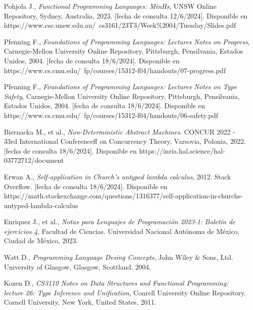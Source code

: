 \begin{thebibliography}{11}
    \bibitem{}
    \label{sec:116}
    \hypertarget{116}{}
    Pohjola J., \textit{Functional Programming Languages: MinHs}, UNSW Online Repository, Sydney, Australia, 2023.  [fecha de consulta 12/6/2024]. Disponible en https://www.cse.unsw.edu.au/~cs3161/23T3/Week\%2004/Tuesday/Slides.pdf

    \bibitem{}
    \label{sec:117}
    \hypertarget{117}{}
    Pfenning F., \textit{Foundations of Programming Languages: Lectures Notes on Progress}, Carnegie-Mellon University Online Repository, Pittsburgh, Pensilvania, Estados Unidos, 2004.  [fecha de consulta 18/6/2024]. Disponible en https://www.cs.cmu.edu/~fp/courses/15312-f04/handouts/07-progress.pdf

    \bibitem{}
    \label{sec:118}
    \hypertarget{118}{}
    Pfenning F., \textit{Foundations of Programming Languages: Lectures Notes on Type Safety}, Carnegie-Mellon University Online Repository, Pittsburgh, Pensilvania, Estados Unidos, 2004.  [fecha de consulta 18/6/2024]. Disponible en https://www.cs.cmu.edu/~fp/courses/15312-f04/handouts/06-safety.pdf

    \bibitem{}
    \label{sec:119}
    \hypertarget{119}{}
    Biernacka M., et al., \textit{Non-Deterministic Abstract Machines}. CONCUR 2022 - 33rd International Conferenceff on Concurrency Theory, Varsovia, Polonia, 2022.  [fecha de consulta 18/6/2024]. Disponible en  https://inria.hal.science/hal-03772712/document


    \bibitem{}
    \label{sec:120}
    \hypertarget{120}{}
    Erwan A., \textit{Self-application in Church's untyped lambda calculus}, 2012. Stack Overflow. [fecha de consulta 18/6/2024]. Disponible en https://math.stackexchange.com/questions/1316377/self-application-in-churchs-untyped-lambda-calculus

    \bibitem{}
    \label{sec:121}
    \hypertarget{121}{}
    Enriquez J., et al., \textit{Notas  para Lenguajes de Programación 2023-1: Boletín de ejercicios 4}, Facultad de Ciencias. Universidad Nacional Autónoma de México, Ciudad de México, 2023.

    \bibitem{}
    \label{sec:122}
    \hypertarget{122}{}
    Watt D., \textit{Programming Language Desing Concepts}, John Wiley \& Sons, Ltd.  University of Glasgow, Glasgow, Scottland. 2004. 

    \bibitem{}
    \label{sec:123}
    \hypertarget{123}{}
    Kozen D., \textit{CS3110 Notes on Data Structures and Functional Programming: lecture 26: Type Inference and Unification}, Conrell University Online Repository. Cornell University, New York, United States, 2011.


\end{thebibliography}
